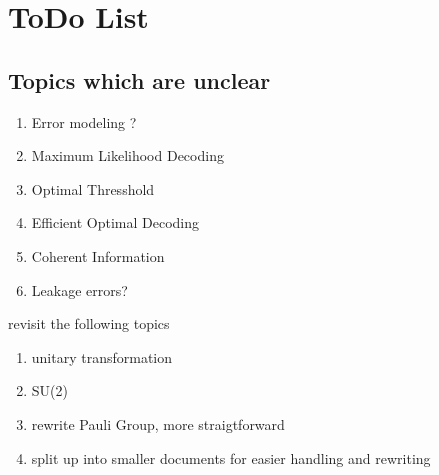 \section{ToDo List}

\subsection{Topics which are unclear}

\begin{enumerate}
    \item Error modeling ? \cite{QECmemory}
    \item Maximum Likelihood Decoding 
    \item Optimal Thresshold
    \item Efficient Optimal Decoding
    \item Coherent Information
    \item Leakage errors? 
\end{enumerate}

revisit the following topics

\begin{enumerate}
    \item unitary transformation
    \item SU(2)
    \item rewrite Pauli Group, more straigtforward
    \item split up into smaller documents for easier handling and rewriting 
\end{enumerate}